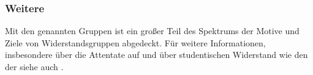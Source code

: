 \subsubsection{Weitere}

Mit den genannten Gruppen ist ein großer Teil des Spektrums der Motive
und Ziele von Widerstandsgruppen abgedeckt. Für weitere Informationen,
insbesondere über die Attentate auf  und
über studentischen Widerstand wie den der  siehe auch \cite[239-245]{GeschDrReich}.

\endinput
